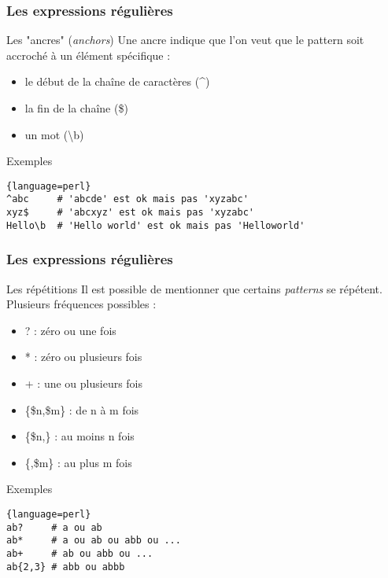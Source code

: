\begin{frame}[fragile]
  \frametitle{Les expressions régulières}

  \begin{block}{Les "ancres" (\textit{anchors})}
    Une ancre indique que l'on veut que le pattern soit accroché à un élément
    spécifique :
    \begin{itemize}
    \item le début de la chaîne de caractères (\textasciicircum)
    \item la fin de la chaîne (\$)
    \item un mot (\textbackslash b)
    \end{itemize}
  \end{block}

  \begin{exampleblock}{Exemples}
    \begin{lstlisting}{language=perl}
^abc     # 'abcde' est ok mais pas 'xyzabc'
xyz$     # 'abcxyz' est ok mais pas 'xyzabc'
Hello\b  # 'Hello world' est ok mais pas 'Helloworld'
    \end{lstlisting}
  \end{exampleblock}
\end{frame}

\begin{frame}[fragile]
  \frametitle{Les expressions régulières}

  \begin{block}{Les répétitions}
    Il est possible de mentionner que certains \textit{patterns} se répétent.
    Plusieurs fréquences possibles :
    \begin{itemize}
    \item ? : zéro ou une fois
    \item * : zéro ou plusieurs fois
    \item + : une ou plusieurs fois
    \item \{\$n,\$m\} : de n à m fois
    \item \{\$n,\} : au moins n fois
    \item \{,\$m\} : au plus m fois
    \end{itemize}
  \end{block}

  \begin{exampleblock}{Exemples}
    \begin{lstlisting}{language=perl}
ab?     # a ou ab
ab*     # a ou ab ou abb ou ...
ab+     # ab ou abb ou ...
ab{2,3} # abb ou abbb
    \end{lstlisting}
  \end{exampleblock}

\end{frame}

